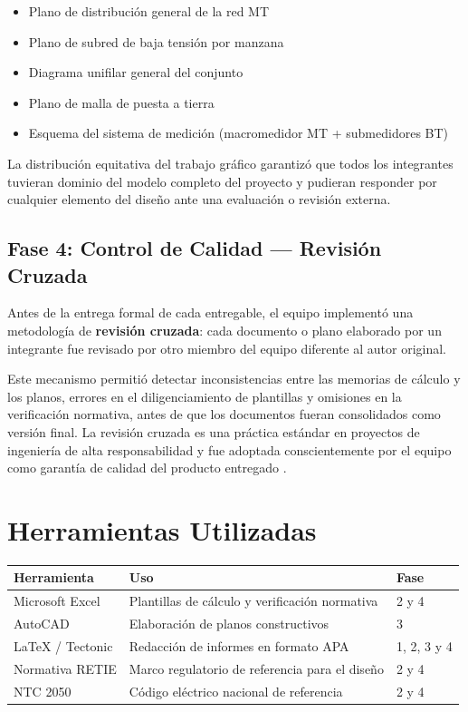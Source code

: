 \begin{itemize}
  \item Plano de distribuci\'on general de la red MT
  \item Plano de subred de baja tensi\'on por manzana
  \item Diagrama unifilar general del conjunto
  \item Plano de malla de puesta a tierra
  \item Esquema del sistema de medici\'on
    (macromedidor MT + submedidores BT)
\end{itemize}

La distribuci\'on equitativa del trabajo gr\'afico garantiz\'o
que todos los integrantes tuvieran dominio del modelo completo
del proyecto y pudieran responder por cualquier elemento del
dise\~no ante una evaluaci\'on o revisi\'on externa.

\subsection{Fase 4: Control de Calidad --- Revisi\'on Cruzada}

Antes de la entrega formal de cada entregable, el equipo
implement\'o una metodolog\'ia de \textbf{revisi\'on cruzada}:
cada documento o plano elaborado por un integrante fue revisado
por otro miembro del equipo diferente al autor original.

Este mecanismo permiti\'o detectar inconsistencias entre las
memorias de c\'alculo y los planos, errores en el diligenciamiento
de plantillas y omisiones en la verificaci\'on normativa, antes
de que los documentos fueran consolidados como versi\'on final.
La revisi\'on cruzada es una pr\'actica est\'andar en proyectos
de ingenier\'ia de alta responsabilidad y fue adoptada conscientemente
por el equipo como garant\'ia de calidad del producto entregado
\citep{icontec2050}.

\section{Herramientas Utilizadas}

\begin{tabular}{lll}
  \toprule
  \bfseries Herramienta & \bfseries Uso & \bfseries Fase \\
  \midrule
  Microsoft Excel &
    Plantillas de c\'alculo y verificaci\'on normativa &
    2 y 4 \\
  AutoCAD &
    Elaboraci\'on de planos constructivos &
    3 \\
  \LaTeX{} / Tectonic &
    Redacci\'on de informes en formato APA &
    1, 2, 3 y 4 \\
  Normativa RETIE &
    Marco regulatorio de referencia para el dise\~no &
    2 y 4 \\
  NTC 2050 &
    C\'odigo el\'ectrico nacional de referencia &
    2 y 4 \\
  \bottomrule
\end{tabular}

